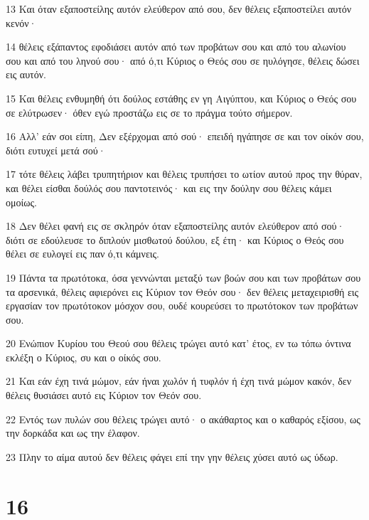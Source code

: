 \par 13 Και όταν εξαποστείλης αυτόν ελεύθερον από σου, δεν θέλεις εξαποστείλει αυτόν κενόν·
\par 14 θέλεις εξάπαντος εφοδιάσει αυτόν από των προβάτων σου και από του αλωνίου σου και από του ληνού σου· από ό,τι Κύριος ο Θεός σου σε ηυλόγησε, θέλεις δώσει εις αυτόν.
\par 15 Και θέλεις ενθυμηθή ότι δούλος εστάθης εν γη Αιγύπτου, και Κύριος ο Θεός σου σε ελύτρωσεν· όθεν εγώ προστάζω εις σε το πράγμα τούτο σήμερον.
\par 16 Αλλ' εάν σοι είπη, Δεν εξέρχομαι από σού· επειδή ηγάπησε σε και τον οίκόν σου, διότι ευτυχεί μετά σού·
\par 17 τότε θέλεις λάβει τρυπητήριον και θέλεις τρυπήσει το ωτίον αυτού προς την θύραν, και θέλει είσθαι δούλός σου παντοτεινός· και εις την δούλην σου θέλεις κάμει ομοίως.
\par 18 Δεν θέλει φανή εις σε σκληρόν όταν εξαποστείλης αυτόν ελεύθερον από σού· διότι σε εδούλευσε το διπλούν μισθωτού δούλου, εξ έτη· και Κύριος ο Θεός σου θέλει σε ευλογεί εις παν ό,τι κάμνεις.
\par 19 Πάντα τα πρωτότοκα, όσα γεννώνται μεταξύ των βοών σου και των προβάτων σου τα αρσενικά, θέλεις αφιερόνει εις Κύριον τον Θεόν σου· δεν θέλεις μεταχειρισθή εις εργασίαν τον πρωτότοκον μόσχον σου, ουδέ κουρεύσει το πρωτότοκον των προβάτων σου.
\par 20 Ενώπιον Κυρίου του Θεού σου θέλεις τρώγει αυτό κατ' έτος, εν τω τόπω όντινα εκλέξη ο Κύριος, συ και ο οίκός σου.
\par 21 Και εάν έχη τινά μώμον, εάν ήναι χωλόν ή τυφλόν ή έχη τινά μώμον κακόν, δεν θέλεις θυσιάσει αυτό εις Κύριον τον Θεόν σου.
\par 22 Εντός των πυλών σου θέλεις τρώγει αυτό· ο ακάθαρτος και ο καθαρός εξίσου, ως την δορκάδα και ως την έλαφον.
\par 23 Πλην το αίμα αυτού δεν θέλεις φάγει επί την γην θέλεις χύσει αυτό ως ύδωρ.

\chapter{16}

